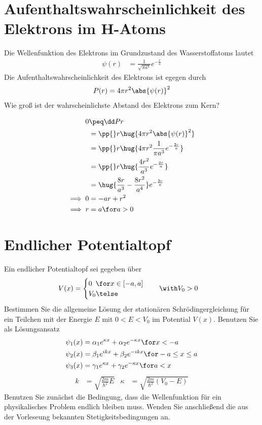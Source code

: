 \documentclass[ex]{exercise_3.0}
\begin{document}
\section{Aufenthaltswahrscheinlichkeit des Elektrons im H-Atoms}
Die Wellenfunktion des Elektrons im Grundzustand des Wasserstoffatoms lautet 
\begin{align*}
    \psi(r) &= \frac1{\sqrt{\pi a^3}} e^{-\frac ra}
\end{align*}
Die Aufenthaltswahrscheinlichkeit des Elektrons ist egegen durch 
\begin{align*}
    P(r) = 4\pi r^2 \abs{\psi(r)}^2
\end{align*}
Wie groß ist der wahrscheinlichste Abstand des Elektrons zum Kern?

\dottedlinete

\begin{align*}
    0&\peq \dd Pr\\
    &= \pp{}r \hug{4\pi r^2 \abs{\psi(r)}^2}\\
    &= \pp{}r \hug{4\pi r^2 \frac1{\pi a^3} e^{-\frac {2r}a}}\\
    &= \pp{}r \hug{\frac{4r^2}{a^3} e^{-\frac {2r}a}}\\
    &= \hug{\frac{8r}{a^3} - \frac{8r^2}{a^4}} e^{-\frac {2r}a}\\
    \implies 0 &= -a r + r^2\\
    \implies r &= a \for a> 0 
\end{align*}

\section{Endlicher Potentialtopf}
Ein endlicher Potentialtopf sei gegeben über 
\begin{align*}
    V(x) &= \begin{cases}
        0 \,\,\,\for x\in[-a,a]\\
        V_0 \telse
    \end{cases} \ \  \ \with V_0>0
\end{align*}
Bestimmen Sie die allgemeine Lösung der stationären Schrödingergleichung für ein Teilchen mit der Energie \(E\)
mit \(0<E<V_0\) im Potential \(V(x)\). Benutzen Sie als Lösungsansatz
\begin{align*}
    \psi_1 (x) &= \alpha_1 e^{\kappa x} + \alpha_2 e^{-\kappa x} \for x<-a\\
    \psi_2 (x) &= \beta_1 e^{i k x} + \beta_2 e^{-i k x} \for -a\le x\le a\\
    \psi_3 (x) &= \gamma_1 e^{\kappa x} + \gamma_2 e^{-\kappa x} \for a<x\\
\end{align*}\tight
\begin{align*}
    k&= \sqrt{\frac{2m}{\hbar^2}E} & \kappa&= \sqrt{\frac{2m}{\hbar^2}(V_0-E)}
\end{align*}
Benutzen Sie zunächst die Bedingung, dass die Wellenfunktion für ein physikalisches Problem endlich bleiben muss. 
Wenden Sie anschließend die aus der Vorleseung bekannten Stetigkeitsbedingungen an.
\end{document}
